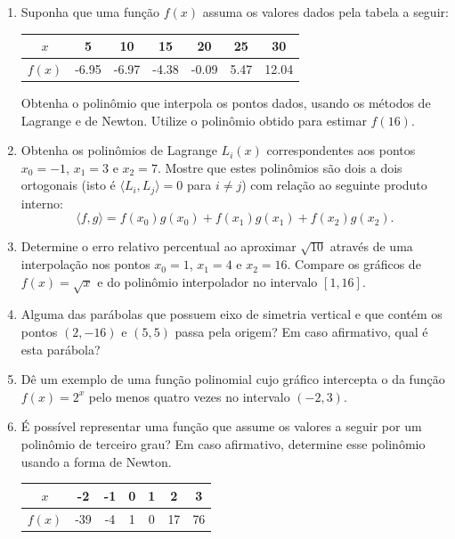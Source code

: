 \documentclass[12pt,a4paper]{article}
\begin{document}
\begin{enumerate}
\item Suponha que uma função $f(x)$ assuma os valores dados pela tabela a seguir:
\begin{center}
\begin{tabular}{|c|c|c|c|c|c|c|}
\hline
   $x$ &  5    & 10     & 15 & 20 & 25 & 30 \\
\hline
$f(x)$ & -6.95 & -6.97  & -4.38 & -0.09 & 5.47 & 12.04\\
\hline
\end{tabular}
\end{center}

Obtenha o polinômio que interpola os pontos dados, usando os métodos de Lagrange e de Newton. Utilize o polinômio obtido para estimar $f(16)$.

\item Obtenha os polinômios de Lagrange $L_i(x)$ correspondentes aos pontos $x_0 = -1$, $x_1 = 3$ e $x_2 = 7$. Mostre que estes polinômios são dois a dois ortogonais (isto é $\langle L_i, L_j \rangle = 0$ para $i \neq j$) com relação ao seguinte produto interno:
\[
\langle f, g \rangle = f(x_0) g(x_0) + f(x_1) g(x_1) + f(x_2) g(x_2).
\]
\item Determine o erro relativo percentual ao aproximar $\sqrt{10}$ através de uma interpolação nos pontos $x_0 = 1$, $x_1 = 4$ e $x_2 = 16$. Compare os gráficos de $f(x) = \sqrt{x}$ e do polinômio interpolador no intervalo $[1,16]$.

\item Alguma das parábolas que possuem eixo de simetria vertical e que contém os pontos $(2, -16)$ e $(5, 5)$ passa pela origem? Em caso afirmativo, qual é esta parábola?
\item Dê um exemplo de uma função polinomial cujo gráfico intercepta o da função $f(x) = 2^x$ pelo menos quatro vezes no intervalo $(-2,3)$.
\item É possível representar uma função que assume os valores a seguir por um polinômio de terceiro grau? Em caso afirmativo, determine esse polinômio usando a forma de Newton.
\begin{center}
\begin{tabular}{|c|c|c|c|c|c|c|}
\hline
   $x$ & -2  & -1 & 0 & 1 &  2 & 3 \\
\hline
$f(x)$ & -39 & -4 & 1 & 0 & 17 & 76\\
\hline
\end{tabular}
\end{center}


\end{enumerate}
\end{document}
